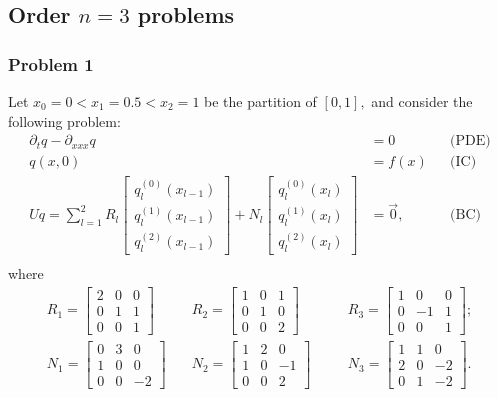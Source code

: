 \documentclass[11pt,reqno,oneside,a4paper]{article}
\theoremstyle{plain} %
\theoremstyle{definition}
\theoremstyle{remark}
\begin{document}
	
\subsection*{Order $n = 3$ problems}
\subsubsection*{Problem 1}
Let $x_0 = 0 < x_1  = 0.5 < x_2 = 1$ be the partition of $[0,1],$ and consider the following problem:
\begin{align*}
\partial_t q - \partial_{xxx} q &= 0 &&\text{(PDE)} \\
q(x, 0) &= f(x) &&\text{(IC)} \\
Uq = \sum^2_{l=1} R_l \begin{bmatrix} q_l^{(0)}(x_{l-1}) \\ q_l^{(1)}(x_{l-1}) \\ q_l^{(2)}(x_{l-1})  \end{bmatrix} + N_l \begin{bmatrix} q_l^{(0)}(x_{l}) \\ q_l^{(1)}(x_{l}) \\ q_l^{(2)}(x_{l}) \end{bmatrix} &= \vec{0}, &&\text{(BC)} \\
\end{align*}
where 
\begin{equation*}
\begin{aligned}
R_1 = \begin{bmatrix} 2 & 0 & 0 \\ 0 & 1 & 1 \\ 0 & 0 & 1 \end{bmatrix} &\quad R_2 = \begin{bmatrix} 1 & 0 & 1 \\ 0 & 1 & 0 \\ 0 & 0 & 2 \end{bmatrix} &&\quad R_3 = \begin{bmatrix} 1 & 0 & 0 \\ 0 & -1 & 1 \\ 0 & 0 & 1 \end{bmatrix}; \\
N_1 = \begin{bmatrix} 0 & 3 & 0 \\ 1 & 0 & 0 \\ 0 & 0 & -2 \end{bmatrix} &\quad N_2 = \begin{bmatrix} 1 & 2 & 0 \\ 1 & 0 & -1 \\ 0 & 0 & 2 \end{bmatrix} &&\quad N_3 = \begin{bmatrix} 1 & 1 & 0 \\ 2 & 0 & -2 \\ 0 & 1 & -2 \end{bmatrix}. 
\end{aligned}
\end{equation*}
\end{document}
